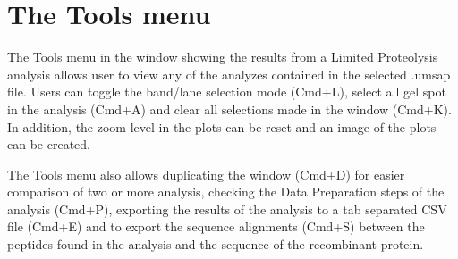 \section{The Tools menu}
\label{sec:limprotToolsMenu}

The Tools menu in the window showing the results from a Limited Proteolysis analysis
allows user to view any of the analyzes contained in the selected .umsap file. Users
can toggle the band/lane selection mode (Cmd+L), select all gel spot in the analysis
(Cmd+A) and clear all selections made in the window (Cmd+K). In addition, the zoom
level in the plots can be reset and an image of the plots can be created.

The Tools menu also allows duplicating the window (Cmd+D) for easier comparison of
two or more analysis, checking the Data Preparation steps of the analysis (Cmd+P),
exporting the results of the analysis to a tab separated CSV file (Cmd+E) and to
export the sequence alignments (Cmd+S) between the peptides found in the analysis
and the sequence of the recombinant protein.